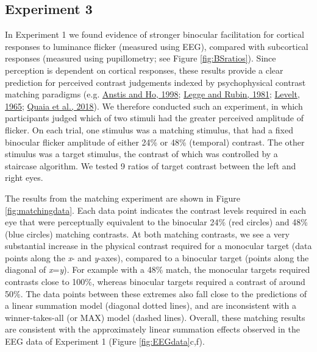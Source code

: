 \documentclass[
]{article}
\begin{document}
\hypertarget{experiment-3}{%
\subsection{Experiment 3}\label{experiment-3}}

In Experiment 1 we found evidence of stronger binocular facilitation for cortical responses to luminance flicker (measured using EEG), compared with subcortical responses (measured using pupillometry; see Figure \ref{fig:BSratios}). Since perception is dependent on cortical responses, these results provide a clear prediction for perceived contrast judgements indexed by psychophysical contrast matching paradigms (e.g. \protect\hyperlink{ref-Anstis1998}{Anstis and Ho, 1998}; \protect\hyperlink{ref-Legge1981}{Legge and Rubin, 1981}; \protect\hyperlink{ref-Levelt1965}{Levelt, 1965}; \protect\hyperlink{ref-Quaia2018}{Quaia et al., 2018}). We therefore conducted such an experiment, in which participants judged which of two stimuli had the greater perceived amplitude of flicker. On each trial, one stimulus was a matching stimulus, that had a fixed binocular flicker amplitude of either 24\% or 48\% (temporal) contrast. The other stimulus was a target stimulus, the contrast of which was controlled by a staircase algorithm. We tested 9 ratios of target contrast between the left and right eyes.

The results from the matching experiment are shown in Figure \ref{fig:matchingdata}. Each data point indicates the contrast levels required in each eye that were perceptually equivalent to the binocular 24\% (red circles) and 48\% (blue circles) matching contrasts. At both matching contrasts, we see a very substantial increase in the physical contrast required for a monocular target (data points along the \emph{x}- and \emph{y}-axes), compared to a binocular target (points along the diagonal of \emph{x}=\emph{y}). For example with a 48\% match, the monocular targets required contrasts close to 100\%, whereas binocular targets required a contrast of around 50\%. The data points between these extremes also fall close to the predictions of a linear summation model (diagonal dotted lines), and are inconsistent with a winner-takes-all (or MAX) model (dashed lines). Overall, these matching results are consistent with the approximately linear summation effects observed in the EEG data of Experiment 1 (Figure \ref{fig:EEGdata}c,f).
\end{document}
